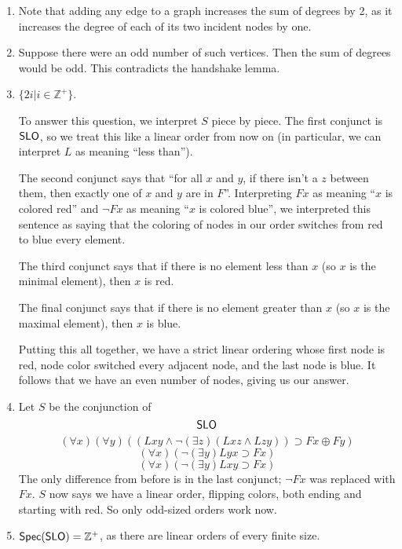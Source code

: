 \begin{mdframed}[linewidth=1]
\begin{enumerate}
    \item Note that adding any edge to a graph increases the sum of degrees by 2, as it increases the degree of each of its two incident nodes by one. 

    \item Suppose there were an odd number of such vertices. Then the sum of degrees would be odd. This contradicts the handshake lemma.

\fi    
    \item $\{2i | i \in \mathbb{Z}^+\}$. 

   To answer this question, we interpret $S$ piece by piece. The first conjunct is $\mbox{$\mathsf{SLO}$}$, so we treat this like a linear order from now on (in particular, we can interpret $L$ as meaning ``less than''). 

   The second conjunct says that ``for all $x$ and $y$, if there isn't a $z$ between them, then exactly one of $x$ and $y$ are in $F$''. Interpreting $Fx$ as meaning ``$x$ is colored red'' and $\lnot Fx$ as meaning ``$x$ is colored blue'', we interpreted this sentence as saying that the coloring of nodes in our order switches from red to blue every element. 

   The third conjunct says that if there is no element less than $x$ (so $x$ is the minimal element), then $x$ is red.

   The final conjunct says that if there is no element greater than $x$ (so $x$ is the maximal element), then $x$ is blue. 

   Putting this all together, we have a strict linear ordering whose first node is red, node color switched every adjacent node, and the last node is blue. It follows that we have an even number of nodes, giving us our answer.  

    \item Let $S$ be the conjunction of 
    \[
       \mbox{$\mathsf{SLO}$}
   \]
   \[
       (\forall x)(\forall y)((Lxy \land \lnot (\exists z)(Lxz \land Lzy)) \supset Fx \oplus Fy)
   \]
   \[
       (\forall x)(\lnot (\exists y)Lyx\supset Fx)
   \]
   \[
       (\forall x)(\lnot (\exists y)Lxy\supset  Fx)
   \]   
   The only difference from before is in the last conjunct; $\lnot Fx$ was replaced with $Fx$. $S$ now says we have a linear order, flipping colors, both ending and starting with red. So only odd-sized orders work now.

    \item $\mbox{$\mathsf{Spec}(\mbox{$\mathsf{SLO}$})$} = \mathbb{Z}^+$, as there are linear orders of every finite size. 


\end{enumerate}
\end{mdframed}
